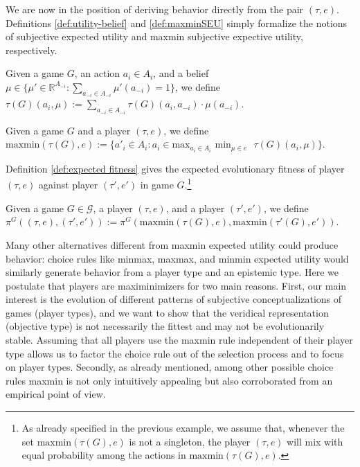 \documentclass[fleqn,reqno,11pt]{article}
\begin{document}
We are now in the position of deriving behavior directly from the pair $(\tau, e)$. Definitions \ref{def:utility-belief} and \ref{def:maxminSEU} simply formalize the notions of subjective expected utility and maxmin subjective expective utility, respectively. 

\begin{definition} \label{def:utility-belief}

Given a game $G$, an action $a_i \in A_i$, and a belief $\mu \in \lbrace \mu' \in \mathbb{R}^{A_{-i}}: \sum_{a_{-i} \in A_{-i}} \mu'(a_{-i}) = 1 \rbrace$, we define $\tau(G)(a_i, \mu):= \sum_{a_{-i} \in A_{-i}} \tau(G)(a_i, a_{-i}) \cdot \mu(a_{-i})$. 

\end{definition}

\begin{definition} \label{def:maxminSEU}

Given a game $G$ and a player $(\tau, e)$, we define $\text{maxmin}(\tau(G), e):= \lbrace a'_i \in A_i : a_i \in \text{max}_{a_i \in A_i} \text{ min}_{\mu \in e} \text{ } \tau(G)(a_i, \mu) \rbrace$.

\end{definition}

\noindent Definition \ref{def:expected fitness} gives the expected evolutionary fitness of player $(\tau, e)$ against player $(\tau', e')$ in game $G$.\footnote{As already specified in the previous example, we assume that, whenever the set $\text{maxmin}(\tau(G), e)$ is not a singleton, the player $(\tau, e)$ will mix with equal probability among the actions in $\text{maxmin}(\tau(G), e)$.}

\begin{definition} \label{def:expected fitness}

Given a game $G \in \mathcal{G}$, a player $(\tau, e)$, and a player $(\tau', e')$, we define $\pi^G((\tau, e),(\tau', e')):= \pi^G(\text{maxmin}(\tau(G), e),\text{maxmin}(\tau'(G), e'))$. 

\end{definition}



Many other alternatives different from maxmin expected utility could produce behavior: choice rules like minmax, maxmax, and minmin expected utility would similarly generate behavior from a player type and an epistemic type. Here we postulate that players are maximinimizers for two main reasons. First, our main interest is the evolution of different patterns of subjective conceptualizations of games (player types), and we want to show that the veridical representation (objective type) is not necessarily the fittest and may not be evolutionarily stable. Assuming that all players use the maxmin rule independent of their player type allows us to factor the choice rule out of the selection process and to focus on player types. Secondly, as already mentioned, among other possible choice rules maxmin is not only intuitively appealing but also corroborated from an empirical point of view.
\end{document}
